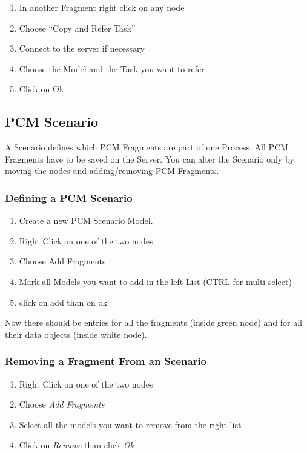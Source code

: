 \documentclass{acm_proc_article-sp}
\begin{document}
\begin{enumerate}
\def\labelenumi{\arabic{enumi}.}
\itemsep1pt\parskip0pt
\item
  In another Fragment right click on any node
\item
  Choose ``Copy and Refer Task''
\item
  Connect to the server if necessary
\item
  Choose the Model and the Task you want to refer
\item
  Click on Ok
\end{enumerate}

%
%
\subsection{PCM Scenario}\label{pcm-scenario}
A Scenario defines which PCM Fragments are part of one Process. All PCM
Fragments have to be saved on the Server. You can alter the Scenario
only by moving the nodes and adding/removing PCM Fragments.

%
%
\subsubsection{Defining a PCM Scenario}\label{defining-a-pcm-scenario}

\begin{enumerate}
\def\labelenumi{\arabic{enumi}.}
\itemsep1pt\parskip0pt
\item
  Create a new PCM Scenario Model.
\item
  Right Click on one of the two nodes
\item
  Choose Add Fragments
\item
  Mark all Models you want to add in the left List (CTRL for multi
  select)
\item
  click on add than on ok
\end{enumerate}

Now there should be entries for all the fragments (inside green node)
and for all their data objects (inside white node).

\subsubsection{Removing a Fragment From an
Scenario}\label{removing-a-fragment-from-an-scenario}

\begin{enumerate}
\def\labelenumi{\arabic{enumi}.}
\itemsep1pt\parskip0pt
\item
  Right Click on one of the two nodes
\item
  Choose \emph{Add Fragments}
\item
  Select all the models you want to remove from the right list
\item
  Click on \emph{Remove} than click \emph{Ok}
\end{enumerate}
\end{document}
